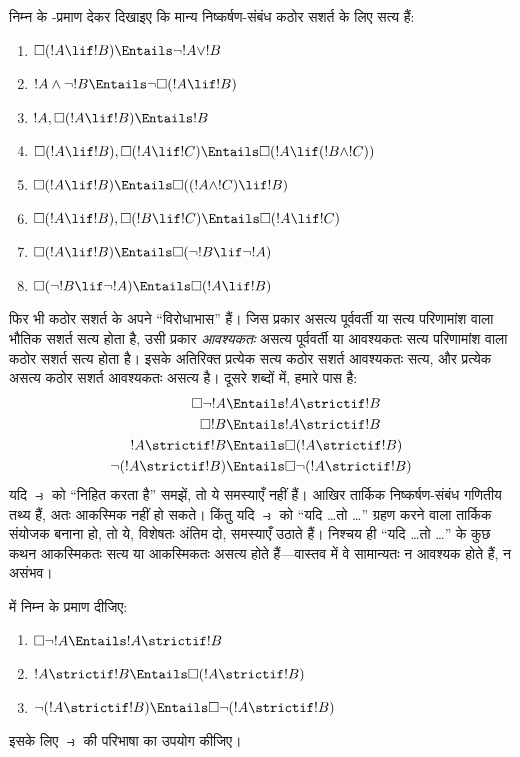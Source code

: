 \documentclass[../../../include/open-logic-section]{subfiles}
\begin{document}
\begin{prob}
  निम्न के -प्रमाण देकर दिखाइए कि मान्य निष्कर्षण-संबंध कठोर सशर्त
  के लिए सत्य हैं:
  \begin{enumerate}
  \item  $\Box(!A \lif !B) \Entails \lnot !A \lor !B$
  \item $!A \land \lnot !B \Entails \lnot\Box(!A \lif !B)$
  \item $!A, \Box(!A \lif !B) \Entails !B$
  \item $\Box(!A \lif !B), \Box(!A \lif !C) \Entails \Box(!A \lif (!B
    \land !C))$
  \item $\Box(!A \lif !B) \Entails \Box((!A \land !C) \lif !B)$
  \item $\Box(!A \lif !B), \Box(!B \lif !C) \Entails \Box(!A
    \lif !C)$
  \item $\Box(!A \lif !B) \Entails \Box(\lnot !B \lif \lnot !A)$
  \item $\Box(\lnot !B \lif \lnot !A) \Entails \Box(!A \lif !B)$
  \end{enumerate}
  \end{prob}

फिर भी कठोर सशर्त के अपने ``विरोधाभास'' हैं। जिस प्रकार असत्य पूर्ववर्ती या
सत्य परिणामांश वाला भौतिक सशर्त सत्य होता है, उसी प्रकार \emph{आवश्यकतः}
असत्य पूर्ववर्ती या आवश्यकतः सत्य परिणामांश वाला कठोर सशर्त सत्य होता है।
इसके अतिरिक्त प्रत्येक सत्य कठोर सशर्त आवश्यकतः सत्य, और प्रत्येक असत्य
कठोर सशर्त आवश्यकतः असत्य है। दूसरे शब्दों में, हमारे पास है:
\begin{align}
  \Box \lnot !A & \Entails !A \strictif !B\\
  \Box !B & \Entails !A \strictif !B\\
  {}!A \strictif !B& \Entails \Box(!A \strictif !B)\\
  \lnot(!A \strictif !B) & \Entails \Box\lnot(!A \strictif !B)
\end{align}
यदि $\strictif$ को ``निहित करता है'' समझें, तो ये समस्याएँ नहीं हैं। आखिर
तार्किक निष्कर्षण-संबंध गणितीय तथ्य हैं, अतः आकस्मिक नहीं हो सकते। किंतु यदि
$\strictif$ को ``यदि \dots तो \dots'' ग्रहण करने वाला तार्किक संयोजक बनाना
हो, तो ये, विशेषतः अंतिम दो, समस्याएँ उठाते हैं। निश्चय ही ``यदि \dots तो
\dots'' के कुछ कथन आकस्मिकतः सत्य या आकस्मिकतः असत्य होते हैं---वास्तव में
वे सामान्यतः न आवश्यक होते हैं, न असंभव।

\begin{prob}
   में निम्न के प्रमाण दीजिए:
  \begin{enumerate}
    \item  $\Box \lnot !A \Entails !A \strictif !B$
    \item $!A \strictif !B \Entails \Box(!A \strictif !B)$
    \item $\lnot(!A \strictif !B)  \Entails \Box\lnot(!A \strictif !B)$
  \end{enumerate}
  इसके लिए $\strictif$ की परिभाषा का उपयोग कीजिए।
\end{prob}
\end{document}
